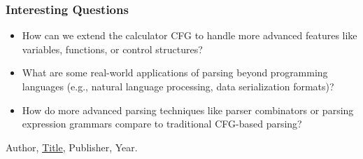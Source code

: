 \documentclass{article}
\theoremstyle{theorem}
\theoremstyle{definition}
\theoremstyle{remark}
\begin{document}
\subsubsection{Interesting Questions}
\begin{itemize}
\item How can we extend the calculator CFG to handle more advanced features like variables, functions, or control structures?
\item What are some real-world applications of parsing beyond programming languages (e.g., natural language processing, data serialization formats)?
\item How do more advanced parsing techniques like parser combinators or parsing expression grammars compare to traditional CFG-based parsing?
\end{itemize}

\begin{thebibliography}{99}
 Author, \href{https://en.wikipedia.org/wiki/LaTeX}{Title}, Publisher, Year.
\end{thebibliography}
\end{document}
